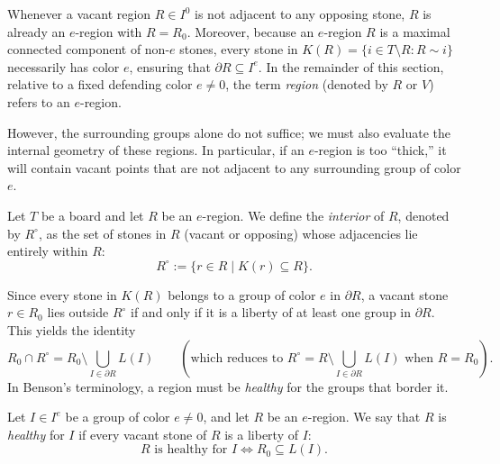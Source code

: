 Whenever a vacant region $R \in I^0$ is not adjacent to any opposing stone, $R$ is already an $e$-region with $R = R_0$. Moreover, because an $e$-region $R$ is a maximal connected component of non-$e$ stones, every stone in $K(R) = \{i \in T \setminus R : R \sim i\}$ necessarily has color $e$, ensuring that $\partial R \subseteq I^e$. In the remainder of this section, relative to a fixed defending color $e \neq 0$, the term \emph{region} (denoted by $R$ or $V$) refers to an $e$-region.

However, the surrounding groups alone do not suffice; we must also evaluate the internal geometry of these regions. In particular, if an $e$-region is too ``thick,'' it will contain vacant points that are not adjacent to any surrounding group of color $e$.

\begin{definition}\label{def:interior_region}
	Let $T$ be a board and let $R$ be an $e$-region. We define the \emph{interior} of $R$, denoted by $R^\circ$, as the set of stones in $R$ (vacant or opposing) whose adjacencies lie entirely within $R$:
	\[
	R^\circ := \{ r \in R \mid K(r) \subseteq R \}.
	\]
\end{definition}

Since every stone in $K(R)$ belongs to a group of color $e$ in $\partial R$, a vacant stone $r \in R_0$ lies outside $R^\circ$ if and only if it is a liberty of at least one group in $\partial R$. This yields the identity
\[
R_0 \cap R^\circ = R_0 \setminus \bigcup_{I \in \partial R} L(I) \qquad \left(\text{which reduces to } R^\circ = R \setminus \bigcup_{I \in \partial R} L(I) \text{ when } R = R_0\right).
\]
In Benson's terminology, a region must be \emph{healthy} for the groups that border it.

\begin{definition}\label{def:healthy_region}
	Let $I \in I^e$ be a group of color $e \neq 0$, and let $R$ be an $e$-region. We say that $R$ is \emph{healthy} for $I$ if every vacant stone of $R$ is a liberty of $I$:
	\[
	R \text{ is healthy for } I \iff R_0 \subseteq L(I).
	\]
\end{definition}

